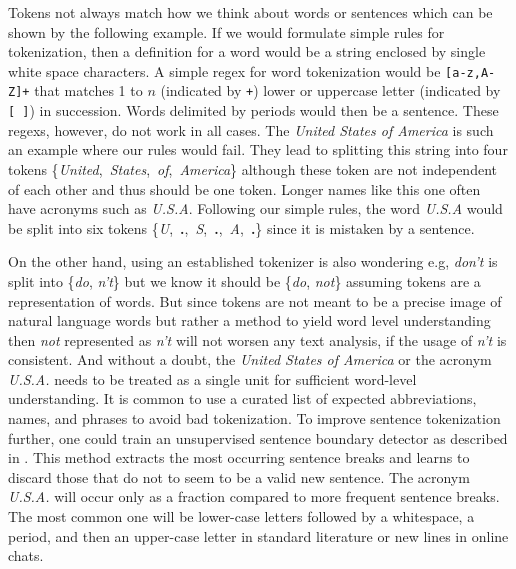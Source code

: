   Tokens not always match how we think about words or sentences which can be shown by the following example.
  If we would formulate simple rules for tokenization, then a definition for a word would be a string enclosed by single white space characters.
  A simple regex for word tokenization would be \texttt{[a-z,A-Z]+} that matches 1 to $n$ (indicated by \texttt{+}) lower or uppercase letter (indicated by \texttt{[ ]}) in succession.
  Words delimited by periods would then be a sentence.
  These regexs, however, do not work in all cases.
  The \textit{United States of America} is such an example where our rules would fail.
  They lead to splitting this string into four tokens \mbox{\{\textquotesingle \textit{United}\textquotesingle, \textquotesingle \textit{States}\textquotesingle, \textquotesingle \textit{of}\textquotesingle, \textquotesingle \textit{America}\textquotesingle\}} although these token are not independent of each other and thus should be one token.
  Longer names like this one often have acronyms such as \textit{U.S.A}.
  Following our simple rules, the word \textit{U.S.A} would be split into six tokens \mbox{\{\textquotesingle \textit{U}\textquotesingle, \textquotesingle \textbf{.}\textquotesingle, \textquotesingle \textit{S}\textquotesingle, \textquotesingle \textbf{.}\textquotesingle, \textquotesingle \textit{A}\textquotesingle, \textquotesingle \textbf{.}\textquotesingle\}} since it is mistaken by a sentence.

  On the other hand, using an established tokenizer is also wondering e.g, \textit{don't} is split into \{\textquotesingle \textit{do}\textquotesingle, \textquotesingle \textit{n't}\textquotesingle\} but we know it should be \{\textquotesingle \textit{do}\textquotesingle, \textquotesingle \textit{not}\textquotesingle\} assuming tokens are a representation of words.
  But since tokens are not meant to be a precise image of natural language words but rather a method to yield word level understanding then \textit{not} represented as \textit{n't} will not worsen any text analysis, if the usage of \textit{n't} is consistent.
  And without a doubt, the \textit{United States of America} or the acronym \textit{U.S.A.} needs to be treated as a single unit for sufficient word-level understanding.
  It is common to use a curated list of expected abbreviations, names, and phrases to avoid bad tokenization.
  To improve sentence tokenization further, one could train an unsupervised sentence boundary detector as described in \cite{Kiss2006}.
  This method extracts the most occurring sentence breaks and learns to discard those that do not to seem to be a valid new sentence.
  The acronym \textit{U.S.A.} will occur only as a fraction compared to more frequent sentence breaks.
  The most common one will be lower-case letters followed by a whitespace, a period, and then an upper-case letter in standard literature or new lines in online chats.

